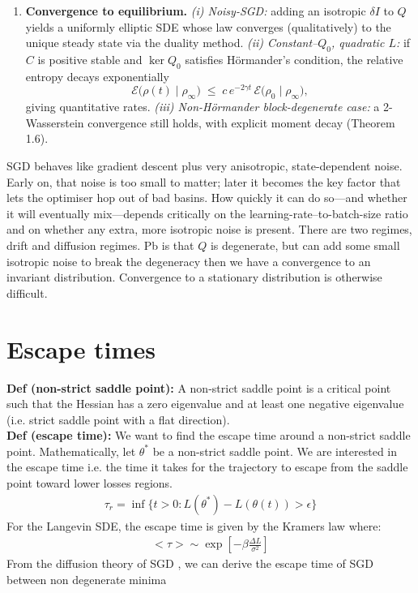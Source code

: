 \documentclass[11pt]{article}
\begin{document}
\begin{enumerate}
\item \textbf{Convergence to equilibrium.}  
      \emph{(i) Noisy-SGD:} adding an isotropic $\delta I$ to $Q$ yields a
      uniformly elliptic SDE whose law converges (qualitatively) to the unique
      steady state via the duality method.
      \emph{(ii) Constant–$Q_0$, quadratic $L$:}  
      if $C$ is positive stable and $\ker Q_0$ satisfies Hörmander’s
      condition, the relative entropy decays exponentially
      \[
        \mathcal E\bigl(\rho(t)\mid\rho_\infty\bigr)
        \;\le\;
        c\,e^{-2\gamma t}\,
        \mathcal E\bigl(\rho_0\mid\rho_\infty\bigr),
      \]
      giving quantitative rates.  
      \emph{(iii) Non-Hörmander block-degenerate case:} a 2-Wasserstein
      convergence still holds, with explicit moment decay (Theorem 1.6).
\end{enumerate}
SGD behaves like gradient descent plus very anisotropic, state-dependent noise. Early on, that noise is too small to matter; later it becomes the key factor that lets the optimiser hop out of bad basins. How quickly it can do so—and whether it will eventually mix—depends critically on the learning-rate–to-batch-size ratio and on whether any extra, more isotropic noise is present. There are two regimes, drift and diffusion regimes. Pb is that $Q$ is degenerate, but can add some small isotropic noise to break the degeneracy then we have a convergence to an invariant distribution. Convergence to a stationary distribution is otherwise difficult.
\section*{Escape times}
\textbf{Def (non-strict saddle point):} A non-strict saddle point is a critical point such that the Hessian has a zero eigenvalue and at least one negative eigenvalue (i.e. strict saddle point with a flat direction).
\\
\textbf{Def (escape time):} We want to find the escape time around a non-strict saddle point. Mathematically, let $\theta^*$ be a non-strict saddle point. We are interested in the escape time i.e. the time it takes for the trajectory to escape from the saddle point toward lower losses regions.
\begin{align}
    \tau_r = \inf\{t > 0: L(\theta^*) - L(\theta(t)) > \epsilon\}
\end{align}
For the Langevin SDE, the escape time is given by the Kramers law where:
\begin{align}
    <\tau> \sim \exp[-\beta\frac{\Delta L}{\sigma^2}]
\end{align}
From the diffusion theory of SGD \citep{xie2020diffusion}, we can derive the escape time of SGD between non degenerate minima 
\end{document}
